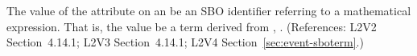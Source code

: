 The value of the  attribute on an \Event {} be
an SBO identifier referring to a mathematical expression.  That is, the
value  be a term derived from \sbointeractionID,
.  (References: L2V2 Section~4.14.1; L2V3
Section~4.14.1; L2V4 Section~\ref{sec:event-sboterm}.)
